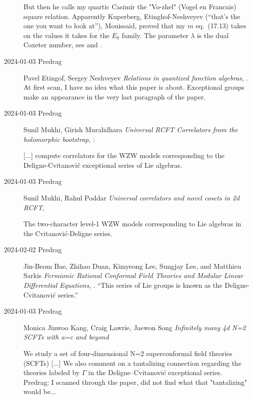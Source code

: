 \begin{description}
But then he calls my quartic Casimir the "Vo-zhel" (Vogel en Francais) square
relation. Apparently
Kuperberg,
Etinghof-Neshveyev  (``that's the one you want to look at''),
Mouissaid,
proved that my $m$
{eq.~(17.13)}
takes on the values it takes for the $E_8$ family. The parameter $\lambda$
is the dual Coxeter number, see  and
.

\item[2024-01-03 Predrag]
Pavel Etingof, Sergey Neshveyev
{\em Relations in quantized function algebras},
.
At first scan, I have no idea what this paper is about.
Exceptional groups make an appearance in the very last paragraph of the paper.


\item[2024-01-03 Predrag]
Sunil Mukhi, Girish Muralidhara
{\em Universal RCFT Correlators from the holomorphic bootstrap},
:

[...] compute
correlators for the WZW models corresponding to the
Deligne-Cvitanovi{\'c} exceptional series of Lie algebras.

\item[2024-01-03 Predrag]
Sunil Mukhi, Rahul Poddar
{\em Universal correlators and novel cosets in 2d RCFT},

The two-character level-1 WZW models corresponding to Lie algebras in the
Cvitanovi{\'c}-Deligne series.

\item[2024-02-02 Predrag]
Jin-Beom Bae, Zhihao Duan, Kimyeong Lee, Sungjay Lee, and Matthieu Sarkis
{\em Fermionic Rational Conformal Field Theories and
Modular Linear Differential Equations},
.
``This series of Lie groups is known
as the Deligne-Cvitanovi\'c series.''


\item[2024-01-03 Predrag]
Monica Jinwoo Kang, Craig Lawrie, Jaewon Song
{\em Infinitely many 4d N=2 SCFTs with a=c and beyond}

We study a set of four-dimensional N=2 superconformal field theories
(SCFTs) [...]
We also comment on a tantalizing connection regarding the theories
labeled by $\Gamma$ in the Deligne--Cvitanovi{\'c} exceptional series.
\\
Predrag: I scanned through the paper, did not find what that "tantalizing"
would be...


\end{description}
